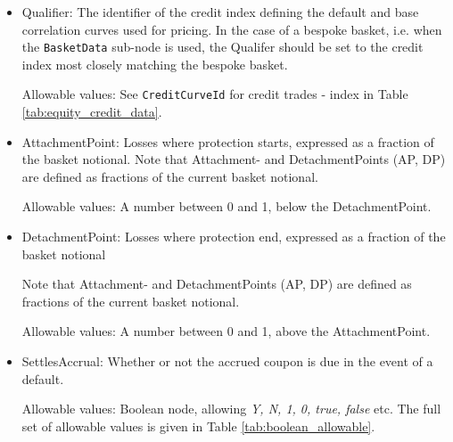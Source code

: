 \begin{itemize}
\item Qualifier: The identifier of the credit index defining the default and base correlation curves used for pricing.  In the case of a bespoke basket, i.e. when the \lstinline!BasketData! sub-node is used, the Qualifer should be set to the credit index most closely matching the bespoke basket.

Allowable values: See \lstinline!CreditCurveId! for credit trades - index in Table \ref{tab:equity_credit_data}. 

\item AttachmentPoint: Losses where protection starts, expressed as a fraction of the basket notional. Note that Attachment- and DetachmentPoints (AP, DP) are defined as fractions of the current basket notional. 



Allowable values: A number between 0 and 1, below the DetachmentPoint. 

\item DetachmentPoint: Losses where protection end, expressed as a fraction of the basket notional

Note that Attachment- and DetachmentPoints (AP, DP) are defined as fractions of the current basket notional. 

Allowable values: A number between 0 and 1, above the AttachmentPoint. 

\item SettlesAccrual: Whether or not the accrued coupon is due in the event of a default.
  
Allowable values: Boolean node, allowing \emph{Y, N, 1, 0, true, false} etc. The full set of allowable values is given in Table \ref{tab:boolean_allowable}. 
  

\end{itemize}
